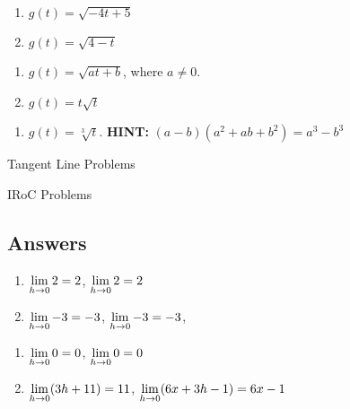 \begin{multicols}{2}
\begin{enumerate}
\setcounter{enumi}{\value{HW}}

\item  $g(t) = \sqrt{-4t+5}$
\item  $g(t) = \sqrt{4-t}$

\setcounter{HW}{\value{enumi}}
\end{enumerate}
\end{multicols}

\begin{multicols}{2}
\begin{enumerate}
\setcounter{enumi}{\value{HW}}

\item  $g(t) = \sqrt{at+b}$, where $a \neq 0$.
\item  $g(t) = t \sqrt{t}$ 

\setcounter{HW}{\value{enumi}}
\end{enumerate}
\end{multicols}

\begin{enumerate}
\setcounter{enumi}{\value{HW}}

\item  $g(t) = \sqrt[3]{t}$.  \textbf{HINT:}  $(a-b)\left(a^2+ab+b^2\right) = a^3 - b^3$  \label{diffquotexerlastc}
\setcounter{HW}{\value{enumi}}
\end{enumerate}

\newpage

Tangent Line Problems

IRoC Problems

\subsection{Answers}


\begin{enumerate}

\item $\displaystyle{\lim_{h \rightarrow 0} 2 = 2}$, $\displaystyle{\lim_{h \rightarrow 0} 2 = 2}$
\item $\displaystyle{\lim_{h \rightarrow 0} -3 = -3}$, $\displaystyle{\lim_{h \rightarrow 0} -3 = -3}$,

\setcounter{HW}{\value{enumi}}
\end{enumerate}

\begin{enumerate}
\setcounter{enumi}{\value{HW}}

\item $\displaystyle{\lim_{h \rightarrow 0} 0 = 0}$,  $\displaystyle{\lim_{h \rightarrow 0} 0 = 0}$
\item  $\displaystyle{\lim_{h \rightarrow 0} (3h+11)= 11}$,   $\displaystyle{\lim_{h \rightarrow 0} (6x+3h-1)= 6x-1}$

\setcounter{HW}{\value{enumi}}
\end{enumerate}

